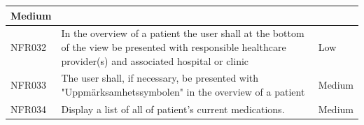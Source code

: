 \documentclass{scrreprt}
\begin{document}
\begin{center}
\begin{tabularx}{\linewidth}{| l | X | l |}
Medium \\ 
\hline
NFR032 & 
In the overview of a patient the user shall at the bottom of the view be presented with responsible healthcare provider(s) and associated hospital or clinic &
Low \\ 
\hline
NFR033 & 
The user shall, if necessary, be presented with "Uppmärksamhetssymbolen" in the overview of a patient &
Medium \\ 
\hline
NFR034 & 
Display a list of all of patient's current medications.  &
Medium \\ 
\hline
\end{tabularx}
\end{center}


\end{document}
